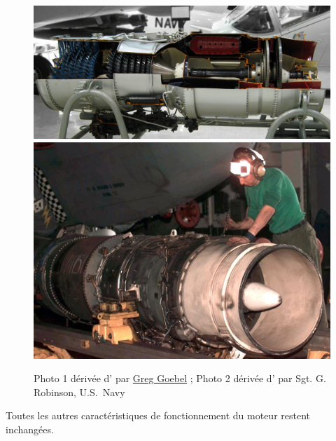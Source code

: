 	\begin{figure}
		\begin{center}
			\includegraphics[width=\columnwidth]{images/photo_pw_j52_1.jpg}
			\includegraphics[width=\columnwidth]{images/photo_pw_j52_2.jpg}
		\end{center}
		{Photo 1 dérivée d’ \ccby par \href{http://www.flickr.com/people/37467370@N08}{Greg Goebel} ; Photo 2 dérivée d’ \pd par Sgt. G. Robinson, U.S.~Navy}
		\label{fig_exo_turbojet_twin_spool}
	\end{figure}
			
		Toutes les autres caractéristiques de fonctionnement du moteur restent inchangées.
		
